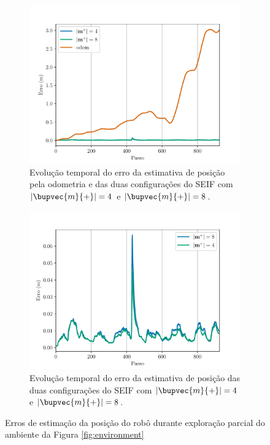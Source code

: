 \begin{figure}
  \centering
  \begin{subfigure}{.75\textwidth}
    \includegraphics[width=\textwidth]{figs/iae-odom-seif.pdf} 
    \caption{Evolução temporal do erro da estimativa de posição pela odometria e das duas configurações do SEIF com $\lvert \bupvec{m}{+}\rvert = 4 $ e $\lvert \bupvec{m}{+}\rvert = 8 $.}
    \label{fig:iae-odom-and-seifs}
  \end{subfigure}
  \begin{subfigure}{.75\textwidth}
    \includegraphics[width=\textwidth]{figs/iae-seifs.pdf} 
    \caption{Evolução temporal do erro da estimativa de posição das duas configurações do SEIF com $\lvert \bupvec{m}{+}\rvert = 4 $ e $\lvert \bupvec{m}{+}\rvert = 8 $.}
    \label{fig:iae-seifs}
  \end{subfigure}
  \caption{Erros de estimação da posição do robô durante exploração parcial do ambiente da Figura \ref{fig:environment}}
  \label{fig:iae}
\end{figure}

